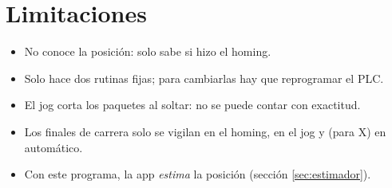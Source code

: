 \section{Limitaciones}
\begin{itemize}
\item No conoce la posición: solo sabe si hizo el homing.
\item Solo hace dos rutinas fijas; para cambiarlas hay que reprogramar el PLC.
\item El jog corta los paquetes al soltar: no se puede contar con exactitud.
\item Los finales de carrera solo se vigilan en el homing, en el jog y (para X) en automático.
\item Con este programa, la app \emph{estima} la posición (sección \ref{sec:estimador}).
\end{itemize}
